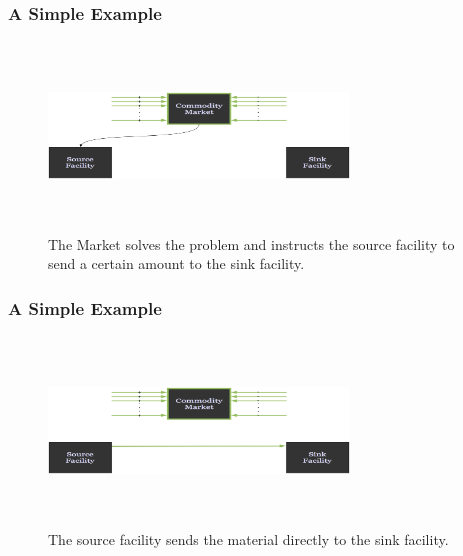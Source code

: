 \documentclass[9pt]{beamer}
\begin{document}
\begin{frame}[ctb!]
  \frametitle{A Simple Example}
  \begin{figure}[htbp!]
    \begin{center}
      \includegraphics[height=5cm, width=8cm]{transmess.eps}
    \end{center}
    \caption{ The Market solves the problem and instructs the source 
    facility to send a certain amount to the sink facility.} 
    \label{fig:transmess}
  \end{figure}
\end{frame}
\begin{frame}[ctb!]
  \frametitle{A Simple Example}
  \begin{figure}[htbp!]
    \begin{center}
      \includegraphics[height=5cm, width=8cm]{trans.eps}
    \end{center}
    \caption{ The source facility sends the material directly to the 
    sink facility.} 
    \label{fig:trans}
  \end{figure}
\end{frame}
\end{document}

